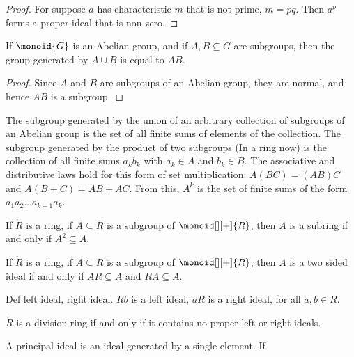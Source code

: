             \begin{proof}
                For suppose $a$ has characteristic $m$ that is not prime,
                $m=pq$. Then $a^{p}$ forms a proper ideal that is non-zero.
            \end{proof}
            \begin{theorem}
                If $\monoid{G}$ is an Abelian group, and if
                $A,B\subseteq{G}$ are subgroups, then the group generated
                by $A\cup{B}$ is equal to $AB$.
            \end{theorem}
            \begin{proof}
                Since $A$ and $B$ are subgroups of an Abelian group, they
                are normal, and hence $AB$ is a subgroup.
            \end{proof}
            The subgroup generated by the union of an arbitrary collection
            of subgroups of an Abelian group is the set of all finite sums
            of elements of the collection. The subgroup generated by the
            product of two subgroups (In a ring now) is the collection of
            all finite sums $a_{k}b_{k}$ with $a_{k}\in{A}$ and
            $b_{k}\in{B}$. The associative and distributive laws hold for
            this form of set multiplication: $A(BC)=(AB)C$ and
            $A(B+C)=AB+AC$. From this, $A^{k}$ is the set of finite sums of
            the form $a_{1}a_{2}\dots{a}_{k-1}a_{k}$.
            \begin{theorem}
                If $\ring{R}$ is a ring, if $A\subseteq{R}$ is a subgroup of
                $\monoid[][+]{R}$, then $A$ is a subring if and only if
                $A^{2}\subseteq{A}$.
            \end{theorem}
            \begin{theorem}
                If $\ring{R}$ is a ring, if $A\subseteq{R}$ is a subgroup of
                $\monoid[][+]{R}$, then $A$ is a two sided ideal if and
                only if $AR\subseteq{A}$ and $RA\subseteq{A}$.
            \end{theorem}
            Def left ideal, right ideal. $Rb$ is a left ideal,
            $aR$ is a right ideal, for all $a,b\in{R}$.
            \begin{theorem}
                $\ring{R}$ is a division ring if and only if it contains no
                proper left or right ideals.
            \end{theorem}
            A principal ideal is an ideal generated by a single element. If
